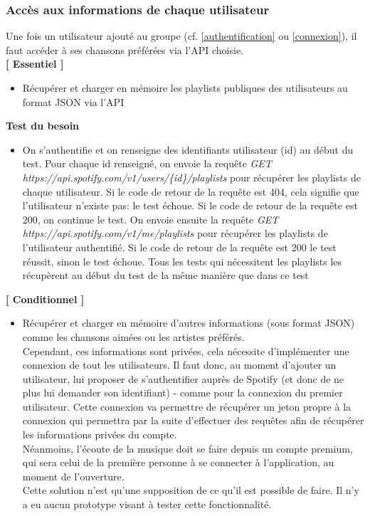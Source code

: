 \documentclass{article}
\begin{document}
		\subsubsection{Accès aux informations de chaque utilisateur} 
		Une fois un utilisateur ajouté au groupe (cf. \ref{authentification} ou \ref{connexion}), il faut accéder à ses chansons préférées via l'API choisie. 
		\newline \\
		\textbf{[ Essentiel ]}
		\begin{itemize}
			\item Récupérer et charger en mémoire les playlists publiques des utilisateurs au format JSON via l'API
		\end{itemize}
		\textbf{Test du besoin}
		\begin{itemize}
			\item On s'authentifie et on renseigne des identifiants utilisateur (id) au début du test. Pour chaque id renseigné, on envoie la requête \newline\textit{GET https://api.spotify.com/v1/users/\{id\}/playlists} pour récupérer les playlists de chaque utilisateur. Si le code de retour de la requête est 404, cela signifie que l'utilisateur n'existe pas: le test échoue. Si le code de retour de la requête est 200, on continue le test. On envoie ensuite la requête \textit{ GET https://api.spotify.com/v1/me/playlists} pour récupérer les playlists de l'utilisateur authentifié. Si le code de retour de la requête est 200 le test réussit, sinon le test échoue. \newline
			      Tous les tests qui nécessitent les playlists les récupèrent au début du test de la même manière que dans ce test
		\end{itemize}
		\textbf{[ Conditionnel ]} \label{connexion de tous les utilisateurs}
		\begin{itemize}
			\item Récupérer et charger en mémoire d'autres informations (sous format JSON) comme les chansons aimées ou les artistes préférés.\\
			Cependant, ces informations sont privées, cela nécessite d'implémenter une connexion de tout les utilisateurs. Il faut donc, au moment d'ajouter un utilisateur, lui proposer de s'authentifier auprès de Spotify (et donc de ne plus lui demander son identifiant) - comme pour la connexion du premier utilisateur. Cette connexion va permettre de récupérer un jeton propre à la connexion qui permettra par la suite d'effectuer des requêtes afin de récupérer les informations privées du compte.\\
			Néanmoins, l'écoute de la musique doit se faire depuis un compte premium, qui sera celui de la première personne à se connecter à l'application, au moment de l'ouverture.\\
			Cette solution n'est qu'une supposition de ce qu'il est possible de faire. Il n'y a eu aucun prototype visant à tester cette fonctionnalité.
		\end{itemize}
\end{document}
